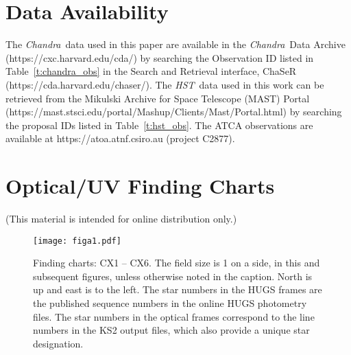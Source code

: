 \documentclass[fleqn,usenatbib]{mnras}
\newcommand{\hst}{\emph{HST}}
\newcommand{\chandra}{\emph{Chandra}}
\begin{document}

\section*{Data Availability}

The \chandra\ data used in this paper are available in the \chandra\ Data Archive (https://cxc.harvard.edu/cda/) by searching the Observation ID listed in Table~\ref{t:chandra_obs} in the Search and Retrieval interface, ChaSeR (https://cda.harvard.edu/chaser/). The \hst\ data used in this work can be retrieved from the Mikulski Archive for Space Telescope (MAST) Portal (https://mast.stsci.edu/portal/Mashup/Clients/Mast/Portal.html) by searching the proposal IDs listed in Table~\ref{t:hst_obs}. The ATCA observations are available at https://atoa.atnf.csiro.au (project C2877).









\appendix

\section{Optical/UV Finding Charts}

(This material is intended for online distribution only.)


\newpage
\begin{figure*}
\texttt{[image: figa1.pdf]}
%
\caption{Finding charts: CX1 -- CX6. The field size is 1 on a side, in this and subsequent figures, unless otherwise noted in the caption. North is up and east is to the left. The star numbers in the HUGS frames are the published sequence numbers in the online HUGS photometry files. The star numbers in the optical frames correspond to the line numbers in the KS2 output files, which also provide a unique star designation.}  \label{f:finding_charts_1-6}
\end{figure*}
\end{document}
